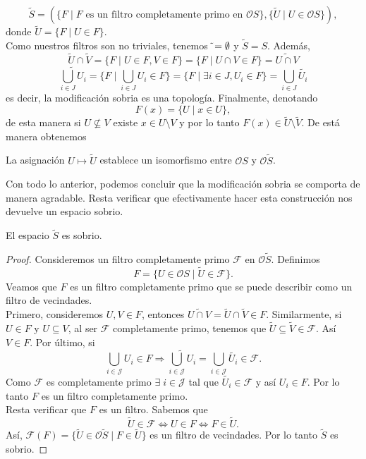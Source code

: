 \[
\tilde{S}=(\{F\mid F \mbox{ es un filtro completamente primo en }\mathcal{O}S\}, \{\tilde{U}\mid U\in \mathcal{O}S\}),
\]
donde $\tilde{U}=\{F\mid U\in F\}$.\\

Como nuestros filtros son no triviales, tenemos $\tilde{\empty}=\emptyset$ y $\tilde{S}=S$. Además,
\[
\tilde{U} \cap \tilde{V}=\{F\mid U\in F, V\in F\}=\{F\mid U\cap V\in F\}=\widetilde{U\cap V}
\]
\[\widetilde{\bigcup_{i\in J}U_i}=\{F\mid \bigcup_{i\in J}U_i\in F\}=\{F\mid \exists i\in J, U_i\in F\}=\bigcup_{i\in J} \widetilde{U_i}
\]
es decir, la modificación sobria es una topología. Finalmente, denotando 
\[
F(x)=\{U\mid x\in U\},
\]
de esta manera si $U\nsubseteq V$ existe $x\in U\setminus V$ y por lo tanto $F(x)\in \tilde{U}\setminus \tilde{V}$. De está manera obtenemos 

\begin{obs}\label{Asobria}
La asignación $U\mapsto \tilde{U}$ establece un isomorfismo entre $\mathcal{O}S$ y $\mathcal{O}\tilde{S}$.
\end{obs}

Con todo lo anterior, podemos concluir que la modificación sobria se comporta de manera agradable. Resta verificar que efectivamente hacer esta construcción nos devuelve un espacio sobrio.

\begin{prop}
    El espacio $\tilde{S}$ es sobrio.
\end{prop}

\begin{proof}
    Consideremos un filtro completamente primo $\mathcal{F}$ en $\mathcal{O}\tilde{S}$. Definimos
    \[
    F=\{U\in \mathcal{O}S\mid \tilde{U}\in \mathcal{F}\}.
    \]
    Veamos que $F$ es un filtro completamente primo que se puede describir como un filtro de vecindades.\\

    \noindent
    Primero, consideremos $U, V\in F$, entonces $\widetilde{U\cap V}=\tilde{U}\cap \tilde{V}\in F$. Similarmente, si $U\in F$ y $U\subseteq V$, al ser $\mathcal{F}$ completamente primo, tenemos que $\tilde{U}\subseteq \tilde{V}\in \mathcal{F}$. Así $V\in F$. Por último, si 
    \[
    \bigcup_{i\in\mathcal{J}}U_i\in F\Rightarrow \widetilde{\bigcup_{i\in\mathcal{J}}U_i}=\bigcup_{i\in\mathcal{J}}\widetilde{U_i}\in \mathcal{F}.
    \]
    Como $\mathcal{F}$ es completamente primo $\exists\; i\in \mathcal{J}$ tal que $\widetilde{U_i}\in \mathcal{F}$ y así $U_i\in F$. Por lo tanto $F$ es un filtro completamente primo.\\

    \noindent
    Resta verificar que $F$ es un filtro. Sabemos que 
    \[
    \tilde{U}\in\mathcal{F}\Leftrightarrow U\in F\Leftrightarrow F\in \tilde{U}.
    \]
    Así, $\mathcal{F}(F)=\{\tilde{U}\in \mathcal{O}\tilde{S}\mid F\in \tilde{U}\}$ es un filtro de vecindades. Por lo tanto $\tilde{S}$ es sobrio.
\end{proof}


